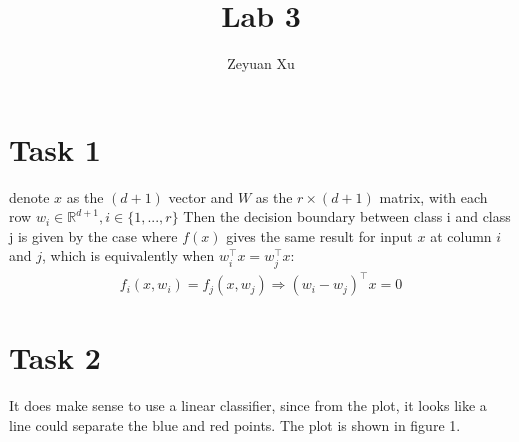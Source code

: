 \documentclass[11pt]{article}
\theoremstyle{plain}
\theoremstyle{definition}
\begin{document}
 
\title{Lab 3}
\author{Zeyuan Xu}
\maketitle

\section{Task 1}
denote $x$ as the $(d+1)$ vector and $W$ as the $r \times (d+1)$ matrix, with each row $w_i \in \mathbb{R}^{d+1}, i\in \{ 1,..., r\}$ Then the decision boundary between class i and class j is given by the case where  $f(x)$ gives the same result for input $x$ at column $i$ and $j$, which is equivalently when $w_i^\top x = w_j^\top x$: \begin{align*}
f_i(x, w_i) = f_j(x, w_j) \Longrightarrow (w_i - w_j)^
\top x = 0
\end{align*}

\section{Task 2}
It does make sense to use a linear classifier, since from the plot, it looks like a line could separate the blue and red points. The plot is shown in figure 1. 
\end{document}
